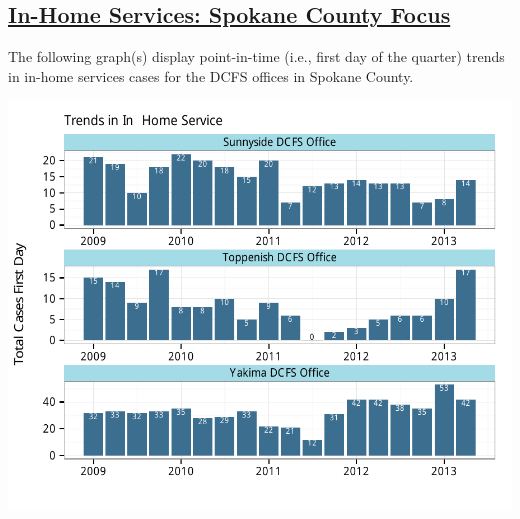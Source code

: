 \documentclass{article}\usepackage[]{graphicx}\usepackage[]{color}
\makeatletter
\def\maxwidth{ %
  \ifdim\Gin@nat@width>\linewidth
    \linewidth
  \else
    \Gin@nat@width
  \fi
}
\newenvironment{knitrout}{}{} %
\makeatother
\begin{document}
\begin{minipage}{\textwidth}
\subsection{\href{http://www.partnersforourchildren.org/child-well-being/visualizations/home-services/trends}
    {In-Home Services: Spokane County Focus}
}
The following graph(s) display point-in-time (i.e., first day of the quarter) trends in in-home services cases for the DCFS offices in Spokane County. 
\nopagebreak[3]
\begin{knitrout}
\color{fgcolor}

{\centering \includegraphics[width=\maxwidth]{figure/ihs_focus} 

}



\end{knitrout}

\end{minipage}

\newpage
\end{document}
